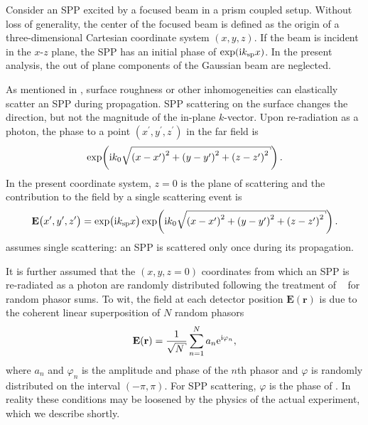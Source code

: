 Consider an SPP excited by a focused beam in a prism coupled setup.  Without
loss of generality, the center of the focused beam is defined as the origin
of a three-dimensional Cartesian coordinate system $(x,y,z)$.  If the beam is
incident in the $x$-$z$ plane, the SPP has an initial phase of $\exp({\mathrm{i}} k_\mathrm{sp}
x)$.  In the present analysis, the out of plane components of the Gaussian
beam are neglected.

As mentioned in , surface roughness or other
inhomogeneities can elastically scatter an SPP during propagation.  SPP
scattering on the surface changes the direction, but not the magnitude of the
in-plane $k$-vector.  Upon re-radiation as a photon, the phase to a point
$(x^\prime,y^\prime,z^\prime)$ in the far field is 
\begin{equation}
\exp\!\left(\mi k_0 \sqrt{{(x-x^\prime)}^2 + {(y-y^\prime)}^2 + {(z-z^\prime)}^2}\right).
\end{equation}
In the present coordinate system, $z=0$ is the plane of scattering and the
contribution to the field by a single scattering event is
\begin{equation}
\mathbf{E}\big(x^\prime,y^\prime,z^\prime\big)=\exp\!\big( \mi \ksp x \big)
\exp\!\left(\mi k_0 \sqrt{{(x-x^\prime)}^2 + {(y-y^\prime)}^2 + {(z-z^\prime)}^2}\right).
\label{eqn:sppsinglescattering}
\end{equation}
 assumes single scattering: an
SPP is scattered only once during its propagation.

It is further assumed that the $(x,y,z=0)$ coordinates from which an SPP is
re-radiated as a photon are randomly distributed following the treatment of
~\cite{goodman2007speckle} for random phasor sums.  To wit, the
field at each detector position $\mathbf{E}(\mathbf{r})$ is due to the
coherent linear superposition of $N$ random phasors
\begin{equation}
\mathbf{E}(\mathbf{r}) = \frac{1}{\sqrt{N}} \sum_{n=1}^{N} a_n \me^{\mi \varphi_n},
\label{eqn:phasorsum}
\end{equation}
where $a_n$ and $\varphi_n$ is the amplitude and phase of the $n$th phasor 
and $\varphi$ is randomly distributed on the interval $(-\pi,\pi)$.  For 
SPP scattering, $\varphi$ is the phase of .
In reality these conditions may be loosened by the physics of the actual
experiment, which we describe shortly.

